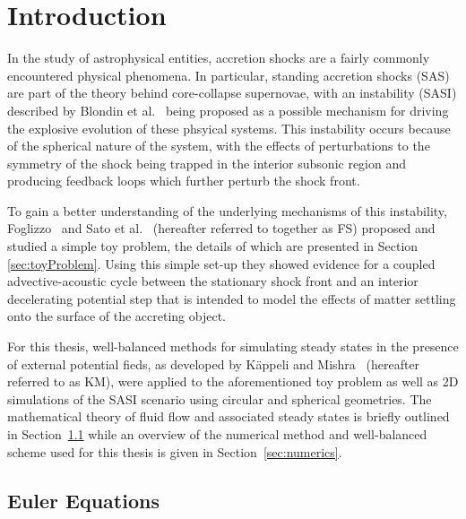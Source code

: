 \newcommand{\package}{\emph}

\chapter{Introduction}

In the study of astrophysical entities, accretion shocks are a fairly commonly encountered physical phenomena. In particular, standing accretion shocks (SAS) are part of the theory behind core-collapse supernovae, with an instability (SASI) described by Blondin et al.~\cite{Blondin2003} being proposed as a possible mechanism for driving the explosive evolution of these phsyical systems. This instability occurs because of the spherical nature of the system, with the effects of perturbations to the symmetry of the shock being trapped in the interior subsonic region and producing feedback loops which further perturb the shock front.

To gain a better understanding of the underlying mechanisms of this instability, Foglizzo~\cite{Foglizzo2009} and Sato et al.~\cite{Sato2009} (hereafter referred to together as FS) proposed and studied a simple toy problem, the details of which are presented in Section \ref{sec:toyProblem}. Using this simple set-up they showed evidence for a coupled advective-acoustic cycle between the stationary shock front and an interior decelerating potential step that is intended to model the effects of matter settling onto the surface of the accreting object.

For this thesis, well-balanced methods for simulating steady states in the presence of external potential fieds, as developed by K\"appeli and Mishra~\cite{Kappeli2014} (hereafter referred to as KM), were applied to the aforementioned toy problem as well as 2D simulations of the SASI scenario using circular and spherical geometries. The mathematical theory of fluid flow and associated steady states is briefly outlined in Section~\ref{sec:euler} while an overview of the numerical method and well-balanced scheme used for this thesis is given in Section~\ref{sec:numerics}.


\section{Euler Equations}
\label{sec:euler}

